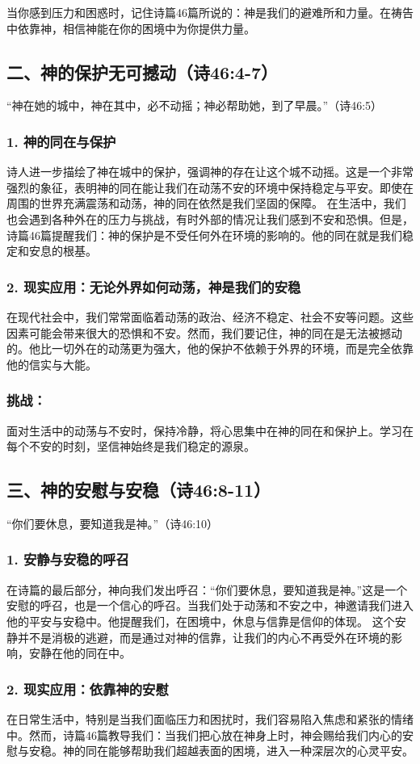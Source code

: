 \documentclass[a4paper, 12pt]{article}
\begin{document}
当你感到压力和困惑时，记住诗篇46篇所说的：神是我们的避难所和力量。在祷告中依靠神，相信神能在你的困境中为你提供力量。
\subsection*{二、神的保护无可撼动（诗46:4-7）}
“神在她的城中，神在其中，必不动摇；神必帮助她，到了早晨。”（诗46:5）

\subsubsection*{1. 神的同在与保护}
诗人进一步描绘了神在城中的保护，强调神的存在让这个城不动摇。这是一个非常强烈的象征，表明神的同在能让我们在动荡不安的环境中保持稳定与平安。即使在周围的世界充满震荡和动荡，神的同在依然是我们坚固的保障。
在生活中，我们也会遇到各种外在的压力与挑战，有时外部的情况让我们感到不安和恐惧。但是，诗篇46篇提醒我们：神的保护是不受任何外在环境的影响的。他的同在就是我们稳定和安息的根基。
\subsubsection*{2. 现实应用：无论外界如何动荡，神是我们的安稳}
在现代社会中，我们常常面临着动荡的政治、经济不稳定、社会不安等问题。这些因素可能会带来很大的恐惧和不安。然而，我们要记住，神的同在是无法被撼动的。他比一切外在的动荡更为强大，他的保护不依赖于外界的环境，而是完全依靠他的信实与大能。
\subsubsection*{挑战：}

面对生活中的动荡与不安时，保持冷静，将心思集中在神的同在和保护上。学习在每个不安的时刻，坚信神始终是我们稳定的源泉。
\subsection*{三、神的安慰与安稳（诗46:8-11）}
“你们要休息，要知道我是神。”（诗46:10）

\subsubsection*{1. 安静与安稳的呼召}
在诗篇的最后部分，神向我们发出呼召：“你们要休息，要知道我是神。”这是一个安慰的呼召，也是一个信心的呼召。当我们处于动荡和不安之中，神邀请我们进入他的平安与安稳中。他提醒我们，在困境中，休息与信靠是信仰的体现。
这个安静并不是消极的逃避，而是通过对神的信靠，让我们的内心不再受外在环境的影响，安静在他的同在中。
\subsubsection*{2. 现实应用：依靠神的安慰}
在日常生活中，特别是当我们面临压力和困扰时，我们容易陷入焦虑和紧张的情绪中。然而，诗篇46篇教导我们：当我们把心放在神身上时，神会赐给我们内心的安慰与安稳。神的同在能够帮助我们超越表面的困境，进入一种深层次的心灵平安。
\end{document}
